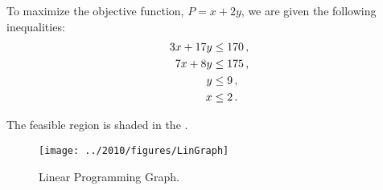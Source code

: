 %
%
\usetikzlibrary{patterns}

\begin{subquestions}
	

\subquestion

To maximize the objective function, $P = x+2y$, we are given the following inequalities:
\begin{align}
	3x + 17y & \leq 170 \,, \nonumber \\
	7x + 8y & \leq 175 \,, \nonumber \\
	y & \leq 9 \,, \nonumber \\
	x & \leq 2 \,.
\end{align}

\begin{subsubquestions}
	

\subsubquestion

The feasible region is shaded in the .
\begin{figure}[H]
	\begin{center}
		\texttt{[image: ../2010/figures/LinGraph]}
		\caption{\label{2010:q1:fig:LinGraph} Linear Programming Graph.}
	\end{center}
\end{figure}



\end{subsubquestions}
\end{subquestions}
